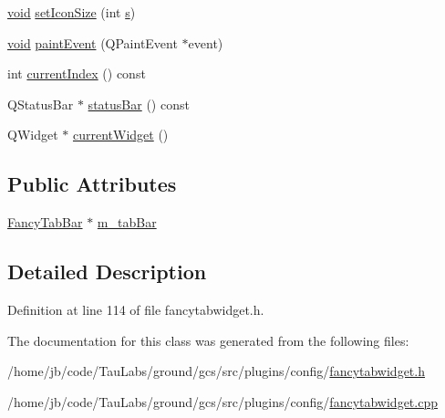 \begin{DoxyCompactItemize}
\item 
\hyperlink{group___u_a_v_objects_plugin_ga444cf2ff3f0ecbe028adce838d373f5c}{void} \hyperlink{group___core_plugin_ga41938cf0209d4846794ddea1b3a4b30c}{set\-Icon\-Size} (int \hyperlink{uavobjecttemplate_8m_a3691308f2a4c2f6983f2880d32e29c84}{s})
\item 
\hyperlink{group___u_a_v_objects_plugin_ga444cf2ff3f0ecbe028adce838d373f5c}{void} \hyperlink{group___core_plugin_ga7f3bc1d5a3bdac8f7944f9970d2756eb}{paint\-Event} (\-Q\-Paint\-Event $\ast$event)
\item 
int \hyperlink{group___core_plugin_ga472485c9f09c372639cad92656a6d73b}{current\-Index} () const 
\item 
\-Q\-Status\-Bar $\ast$ \hyperlink{group___core_plugin_ga5581f5fbc90b13a3ddbca61c0dba433c}{status\-Bar} () const 
\item 
\-Q\-Widget $\ast$ \hyperlink{group___core_plugin_ga6a20510df503ecedaf372f0752e7d99b}{current\-Widget} ()
\end{DoxyCompactItemize}
\subsection*{\-Public \-Attributes}
\begin{DoxyCompactItemize}
\item 
\hyperlink{class_fancy_tab_bar}{\-Fancy\-Tab\-Bar} $\ast$ \hyperlink{group___core_plugin_gaae154251a11cba863e66fd9b7363a605}{m\-\_\-tab\-Bar}
\end{DoxyCompactItemize}


\subsection{\-Detailed \-Description}


\-Definition at line 114 of file fancytabwidget.\-h.



\-The documentation for this class was generated from the following files\-:\begin{DoxyCompactItemize}
\item 
/home/jb/code/\-Tau\-Labs/ground/gcs/src/plugins/config/\hyperlink{config_2fancytabwidget_8h}{fancytabwidget.\-h}\item 
/home/jb/code/\-Tau\-Labs/ground/gcs/src/plugins/config/\hyperlink{config_2fancytabwidget_8cpp}{fancytabwidget.\-cpp}\end{DoxyCompactItemize}
